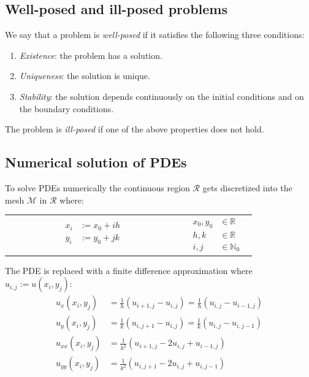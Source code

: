 \subsection{Well-posed and ill-posed problems}
We say that a problem is \textit{well-posed} if it satisfies the following three conditions:
\begin{enumerate}
    \item \textit{Existence}: the problem has a solution.
    \item \textit{Uniqueness}: the solution is unique.
    \item \textit{Stability}: the solution depends continuously on the initial conditions and on the boundary conditions.
\end{enumerate}
The problem is \textit{ill-posed} if one of the above properties does not hold.

\subsection{Numerical solution of PDEs}

To solve PDEs numerically the continuous region $\mathcal{R}$ gets discretized into the mesh $\mathcal{M}$ in $\mathcal{R}$ where:

\begin{tabular}{ m{0.6\linewidth}  m{0.2\linewidth} }
    {
        \begin{align*}
            x_i & := x_0 + ih \\
            y_i & := y_0 + jk \\
        \end{align*}
    }
     &
    {
            \begin{align*}
                x_0, y_0 & \in \mathbb{R}   \\
                h, k     & \in \mathbb{R}   \\
                i, j     & \in \mathbb{N}_0
            \end{align*}
        }
\end{tabular}

The PDE is replaced with a finite difference approximation where $u_{i,j}:=u(x_i,y_j)$:
\begin{align*}
    u_{x}(x_i,y_j)  & = \frac1h(u_{i+1,j}-u_{i,j})=\frac1h(u_{i,j}-u_{i-1,j})         \\
    u_{y}(x_i,y_j)  & = \frac{1}{k}(u_{i,j+1}-u_{i,j})=\frac{1}{k}(u_{i,j}-u_{i,j-1}) \\
    u_{xx}(x_i,y_j) & = \frac{1}{h^{2}}(u_{i+1,j}-2u_{i,j}+u_{i-1,j})                 \\
    u_{yy}(x_i,y_j) & = \frac{1}{k^{2}}(u_{i,j+1}-2u_{i,j}+u_{i,j-1})
\end{align*}

